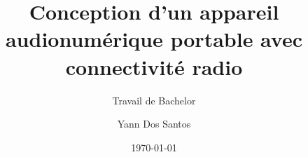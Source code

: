 \author{Yann Dos Santos}

\setmale

\title{ Conception d'un appareil audionumérique portable avec connectivité radio}

\subtitle{Travail de Bachelor}


\date{\today}

